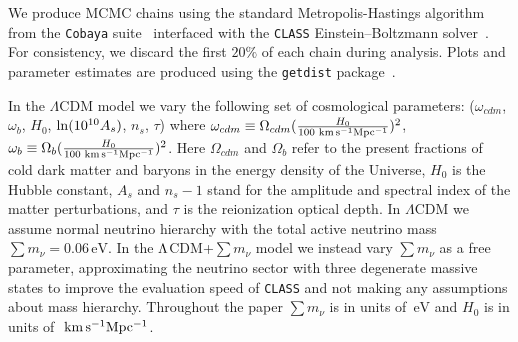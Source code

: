 \documentclass[12pt,a4paper]{article}
\newcommand{\kms}{{\rm \,\,km\,s^{-1}Mpc^{-1}}}
\newcommand{\eV}{\,\text{eV}}
\newcommand\?{/\hspace{0pt}}
\renewcommand{\ln}{\mathop{\rm ln}\nolimits}
\def\Neff{N_{\rm eff}}
\def\Mnu{\sum m_\nu}
\begin{document}
We produce MCMC chains using the standard Metropolis-Hastings algorithm from the \texttt{Cobaya} suite~\cite{Torrado:2020dgo} interfaced with the \texttt{CLASS} Einstein--Boltzmann solver~\cite{Diego_Blas_2011}. For consistency, we discard the first $20\%$ of each chain during analysis. Plots and parameter estimates are produced using the \texttt{getdist} package~\cite{Lewis:2019xzd}. 

In the $\Lambda$CDM model we vary the following set of cosmological parameters: ($\omega_{cdm}$, $\omega_b$, $H_0$, $\ln(10^{10}A_s)$, $n_s$, $\tau$) where 
$\omega_{cdm}\equiv \Omega_{cdm} (\frac{H_0}{100\kms})^2$, $\omega_b\equiv\Omega_b (\frac{H_0}{100\kms})^2$. Here $\Omega_{cdm}$ and $\Omega_{b}$ refer to the present fractions of cold dark matter and baryons in the energy density of the Universe, $H_0$ is the Hubble constant, $A_s$ and $n_s-1$ stand for the amplitude and spectral index of the matter perturbations, and $\tau$ is the reionization optical depth. 
In $\Lambda$CDM we assume normal neutrino hierarchy with the total active neutrino mass $\sum m_\nu=0.06\eV$. %
In the $\rm \Lambda$CDM+$\sum m_\nu$ model we instead vary $\Mnu$ as a free parameter, approximating the neutrino sector with three degenerate massive states to improve the evaluation speed of \texttt{CLASS} and not making any assumptions about mass hierarchy. Throughout the paper $\sum m_\nu$ is in units of $\eV$ and $H_0$ is in units of $\kms$.











\end{document}
